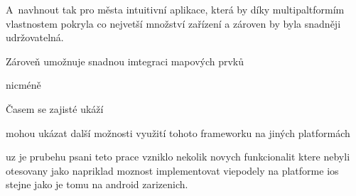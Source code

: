 A~navhnout tak pro města intuitivní aplikace, která by díky multipaltformím vlastnostem pokryla co nejvetší množství zařízení
a zároven by byla snadněji udržovatelná.

Zároveň umožnuje snadnou imtegraci mapových prvků 

nicméně 


Časem se zajisté ukáží

\bigskip

mohou ukázat další možnosti využití tohoto frameworku na jiných platformách

uz je prubehu psani teto prace vzniklo nekolik novych funkcionalit ktere nebyli otesovany jako napriklad moznost
implementovat viepodely na platforme ios stejne jako je tomu na android zarizenich.
